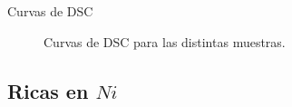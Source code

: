\documentclass[11pt]{beamer}
\begin{document}
\begin{frame}{Curvas de DSC}
\begin{figure}[H]
{						}
					\caption*{Curvas de DSC para las distintas muestras.}
				\end{figure}	
			\end{frame}
			
	\subsection{Ricas en $Ni$}	
\end{document}
